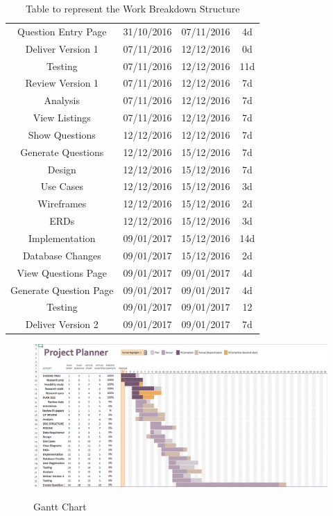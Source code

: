 \begin{table}[h!]
\begin{tabular}{||c c c c||}
Question Entry Page 	& 31/10/2016 & 07/11/2016 & 4d \\
Deliver Version 1 		& 07/11/2016 & 12/12/2016 & 0d \\
Testing 				& 07/11/2016 & 12/12/2016 & 11d \\
Review Version 1 		& 07/11/2016 & 12/12/2016 & 7d \\
Analysis 				& 07/11/2016 & 12/12/2016 & 7d \\
View Listings 			& 07/11/2016 & 12/12/2016 & 7d \\
Show Questions 		& 12/12/2016 & 12/12/2016 & 7d \\
Generate Questions 		& 12/12/2016 & 15/12/2016 & 7d \\
Design 				& 12/12/2016 & 15/12/2016 & 7d \\
Use Cases 			& 12/12/2016 & 15/12/2016 & 3d \\
Wireframes 			& 12/12/2016 & 15/12/2016 & 2d \\
ERDs 				& 12/12/2016 & 15/12/2016 & 3d \\
Implementation 		& 09/01/2017 & 15/12/2016 & 14d \\
Database Changes 		& 09/01/2017 & 15/12/2016 & 2d \\
View Questions Page 	& 09/01/2017 & 09/01/2017 & 4d \\
Generate Question Page 	& 09/01/2017 & 09/01/2017 & 4d \\
Testing 				& 09/01/2017 & 09/01/2017 & 12 \\
Deliver Version 2 		& 09/01/2017 & 09/01/2017 & 7d \\
												
\hline
\end{tabular}
\caption{Table to represent the Work Breakdown Structure}
\label{table:1}
\end{table}

\begin{figure}[htbp]
\center \includegraphics[width=400pt]{Figures/gantt}\\
\caption{Gantt Chart} \label{Figure: Gantt Chart}
\end{figure}
